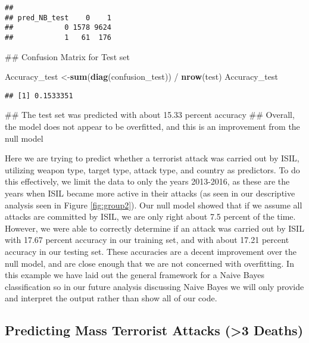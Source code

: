 \documentclass[11pt,letterpaper,]{article}
\newenvironment{Shaded}{\begin{snugshade}}{\end{snugshade}}
\newcommand{\KeywordTok}[1]{\textcolor[rgb]{0.13,0.29,0.53}{\textbf{{#1}}}}
\newcommand{\StringTok}[1]{\textcolor[rgb]{0.31,0.60,0.02}{{#1}}}
\newcommand{\NormalTok}[1]{{#1}}
\theoremstyle{definition}
\theoremstyle{definition}
\theoremstyle{definition}
\theoremstyle{remark}
\begin{document}
\begin{verbatim}
##             
## pred_NB_test    0    1
##            0 1578 9624
##            1   61  176
\end{verbatim}

\begin{Shaded}
\begin{Highlighting}[]
\NormalTok{## Confusion Matrix for Test set}


\NormalTok{Accuracy_test <-}\KeywordTok{sum}\NormalTok{(}\KeywordTok{diag}\NormalTok{(confusion_test))   /}\StringTok{ }\KeywordTok{nrow}\NormalTok{(test)}
\NormalTok{Accuracy_test}
\end{Highlighting}
\end{Shaded}

\begin{verbatim}
## [1] 0.1533351
\end{verbatim}

\begin{Shaded}
\begin{Highlighting}[]
\NormalTok{## The test set was predicted with about 15.33 percent accuracy}
\NormalTok{## Overall, the model does not appear to be overfitted, and this is an improvement from the null model}
\end{Highlighting}
\end{Shaded}

Here we are trying to predict whether a terrorist attack was carried out
by ISIL, utilizing weapon type, target type, attack type, and country as
predictors. To do this effectively, we limit the data to only the years
2013-2016, as these are the years when ISIL became more active in their
attacks (as seen in our descriptive analysis seen in Figure
\ref{fig:group2}). Our null model showed that if we assume all attacks
are committed by ISIL, we are only right about 7.5 percent of the time.
However, we were able to correctly determine if an attack was carried
out by ISIL with 17.67 percent accuracy in our training set, and with
about 17.21 percent accuracy in our testing set. These accuracies are a
decent improvement over the null model, and are close enough that we are
not concerned with overfitting. In this example we have laid out the
general framework for a Naive Bayes classification so in our future
analysis discussing Naive Bayes we will only provide and interpret the
output rather than show all of our code.

\subsection{Predicting Mass Terrorist Attacks (\textgreater{}3
Deaths)}\label{predicting-mass-terrorist-attacks-3-deaths}
\end{document}
